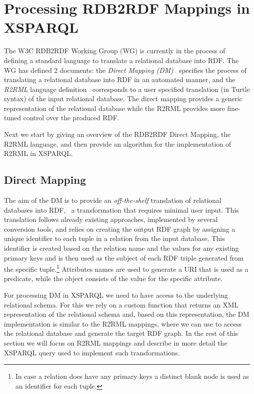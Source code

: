 \section{Processing RDB2RDF Mappings in XSPARQL}
\label{sec:examples-rdb2rdf}

The W3C RDB2RDF Working Group (WG) is currently in the process of defining a standard language to translate a relational
database into \ac{RDF}.  
%
The WG has defined 2 documents: the \emph{Direct Mapping (DM)}~\cite{ArenasPrudhommeauxSequeda:2011aa} specifies the
process of translating a relational database into \ac{RDF} in an automated manner, and the \emph{R2RML} language
definition~\cite{DasSundaraCyganiak:2011aa} corresponds to a user specified translation (in Turtle syntax) of the input
relational database.  The direct mapping provides a generic representation of the relational database while the R2RML
provides more fine-tuned control over the produced \ac{RDF}.

Next we start by giving an overview of the RDB2RDF Direct Mapping, the R2RML language, and then provide an algorithm for
the implementation of R2RML in XSPARQL.

\subsection{Direct Mapping}
\label{sec:direct-mapping}

The aim of the DM is to provide an \emph{off-the-shelf} translation of relational databases into \ac{RDF}, \ie~a
transformation that requires minimal user input.  
%
This translation follows already existing approaches, implemented by several conversion tools, and relies on creating
the output \ac{RDF} graph by assigning a unique identifier to each tuple in a relation from the input database.  This
identifier is created based on the relation name and the values for any existing primary keys and is then used as the
subject of each \ac{RDF} triple generated from the specific tuple.\footnote{In case a relation does have any primary
  keys a distinct blank node is used as an identifier for each tuple.}
%
Attributes names are used to generate a \ac{URI} that is used as a predicate, while the object consists of the value for
the specific attribute.
%

For processing DM in XSPARQL we need to have access to the underlying relational schema.  For this we rely on a custom
function that returns an \ac{XML} representation of the relational schema and, based on this representation, the DM
implementation is similar to the R2RML mappings, where we can use  to access the relational database and
generate the target \ac{RDF} graph.
%
In the rest of this section we will focus on R2RML mappings and describe in more detail the XSPARQL query used to
implement such transformations.


